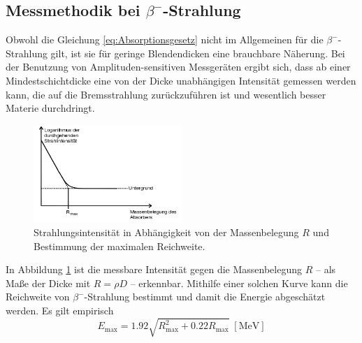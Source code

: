 \subsection{Messmethodik bei \texorpdfstring{$\beta^-$}{Beta}-Strahlung}
Obwohl die Gleichung \eqref{eq:Absorptionsgesetz} nicht im Allgemeinen für die $\beta^-$-Strahlung gilt, ist sie für geringe Blendendicken eine brauchbare Näherung.
Bei der Benutzung von Amplituden-sensitiven Messgeräten ergibt sich, dass ab einer Mindestschichtdicke eine von der Dicke unabhängigen Intensität gemessen werden kann, die auf die Bremsstrahlung zurückzuführen ist und wesentlich besser Materie durchdringt.
\begin{figure}[ht]
	\centering
	\includegraphics[width=0.5\textwidth]{Bilder/absorption.png}
	\caption{Strahlungsintensität in Abhängigkeit von der Massenbelegung $R$ und Bestimmung der maximalen Reichweite.\cite{skript}}
	\label{fig:messkurve}
\end{figure}
In Abbildung \ref{fig:messkurve} ist die messbare Intensität gegen die Massenbelegung $R$ -- als Maße der Dicke mit $R=\rho D$ -- erkennbar.
Mithilfe einer solchen Kurve kann die Reichweite von $\beta^-$-Strahlung bestimmt und damit die Energie abgeschätzt werden.
Es gilt empirisch
\begin{equation}
	E_\text{max}=1.92\sqrt{R_\text{max}^2+0.22R_\text{max}}\;[\si{\mega\electronvolt}]
\label{eq:e_max}
\end{equation}
